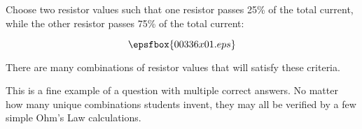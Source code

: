 

Choose two resistor values such that one resistor passes 25\% of the total current, while the other resistor passes 75\% of the total current:

$$\epsfbox{00336x01.eps}$$







There are many combinations of resistor values that will satisfy these criteria.







This is a fine example of a question with multiple correct answers.  No matter how many unique combinations students invent, they may all be verified by a few simple Ohm's Law calculations.




